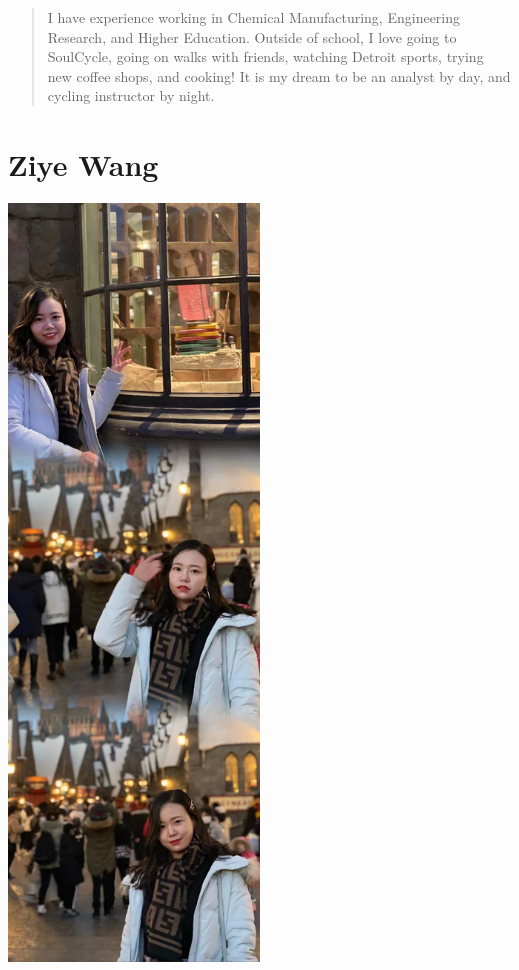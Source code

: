 \documentclass[
]{book}
\begin{document}
\begin{quote}
I have experience working in Chemical Manufacturing, Engineering Research, and Higher Education. Outside of school, I love going to SoulCycle, going on walks with friends, watching Detroit sports, trying new coffee shops, and cooking! It is my dream to be an analyst by day, and cycling instructor by night.
\end{quote}

\hypertarget{ziye-wang}{%
\section{Ziye Wang}\label{ziye-wang}}

\includegraphics[width=0.5\textwidth,height=\textheight]{Images/Siye.jpg}
\end{document}

